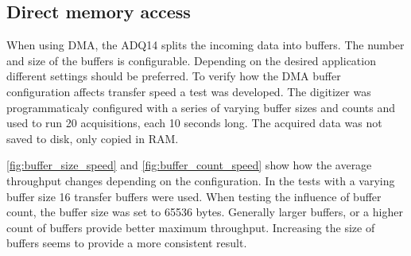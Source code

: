 \subsection{Direct memory access}

When using DMA, the ADQ14 splits the incoming data into buffers.
The number and size of the buffers is configurable. Depending
on the desired application different settings should be preferred. 
To verify how the DMA buffer configuration affects transfer speed a 
test was developed. The digitizer was programmaticaly configured with 
a series of varying buffer sizes and counts and used to run 20 
acquisitions, each 10 seconds long. The acquired data was not 
saved to disk, only copied in RAM.

\autoref{fig:buffer_size_speed} and \autoref{fig:buffer_count_speed}
show how the average throughput changes depending on the
configuration. In the tests with a varying buffer size 16 transfer buffers were used.
When testing the influence of buffer count, the buffer size was set to 65536 bytes.
Generally larger buffers, or a higher count of buffers
provide better maximum throughput. Increasing the size of buffers
seems to provide a more consistent result. 
